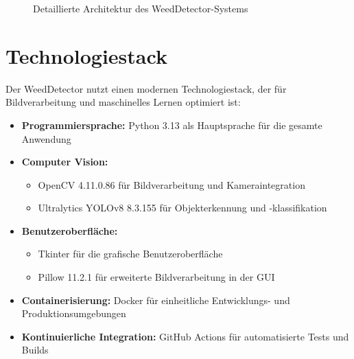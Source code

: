 \documentclass[12pt, a4paper]{scrreprt}
\begin{document}
\begin{figure}[h!]
    \caption{Detaillierte Architektur des WeedDetector-Systems}
    \label{fig:systemarchitektur}
\end{figure}

\section{Technologiestack}
Der WeedDetector nutzt einen modernen Technologiestack, der für Bildverarbeitung und maschinelles Lernen optimiert ist:

\begin{itemize}
    \item \textbf{Programmiersprache:} Python 3.13 als Hauptsprache für die gesamte Anwendung
    \item \textbf{Computer Vision:}
    \begin{itemize}
        \item OpenCV 4.11.0.86 für Bildverarbeitung und Kameraintegration
        \item Ultralytics YOLOv8 8.3.155 für Objekterkennung und -klassifikation
    \end{itemize}
    \item \textbf{Benutzeroberfläche:}
    \begin{itemize}
        \item Tkinter für die grafische Benutzeroberfläche
        \item Pillow 11.2.1 für erweiterte Bildverarbeitung in der GUI
    \end{itemize}
    \item \textbf{Containerisierung:} Docker für einheitliche Entwicklungs- und Produktionsumgebungen
    \item \textbf{Kontinuierliche Integration:} GitHub Actions für automatisierte Tests und Builds
\end{itemize}
\end{document}
